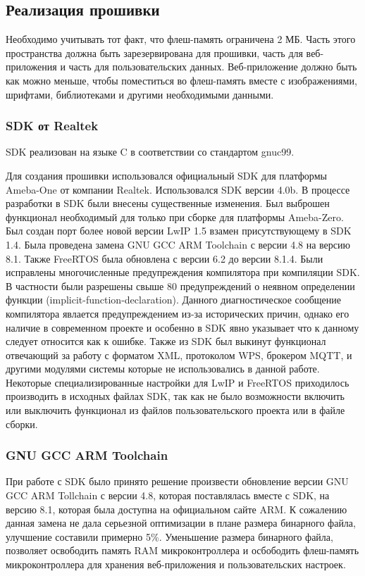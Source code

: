\subsection{Реализация прошивки}
Необходимо учитывать тот факт, что флеш-память ограничена 2 МБ. Часть этого пространства должна быть зарезервирована для прошивки, часть для веб-приложения и часть для пользовательских данных. Веб-приложение должно быть как можно меньше, чтобы поместиться во флеш-память вместе с изображениями, шрифтами, библиотеками и другими необходимыми данными. 

\subsubsection{SDK от Realtek}
SDK реализован на языке C в соответствии со стандартом gnuc99.

Для создания прошивки использовался официальный SDK для платформы Ameba-One от компании Realtek.
Использовался SDK версии 4.0b.
В процессе разработки в SDK были внесены существенные изменения. Был выброшен функционал необходимый для только при сборке для платформы Ameba-Zero. Был создан порт более новой версии LwIP 1.5 взамен присутствующему в SDK 1.4. Была проведена замена GNU GCC ARM Toolchain с версии 4.8 на версию 8.1. Также FreeRTOS была обновлена с версии 6.2 до версии 8.1.4. Были исправлены многочисленные предупреждения компилятора при компиляции SDK. В частности были разрешены свыше 80 предупреждений о неявном определении функции (implicit-function-declaration). Данного диагностическое сообщение компилятора явлается предупреждением из-за исторических причин, однако его наличие в современном проекте и особенно в SDK явно указывает что к данному следует относится как к ошибке. Также из SDK был выкинут функционал отвечающий за работу с форматом XML, протоколом WPS, брокером MQTT, и другими модулями системы которые не использовались в данной работе. Некоторые специализированные настройки для LwIP и FreeRTOS приходилось производить в исходных файлах SDK, так как не было возможности включить или выключить функционал из файлов пользовательского проекта или в файле сборки.


\subsubsection{GNU GCC ARM Toolchain}
При работе с SDK было принято решение произвести обновление версии GNU GCC ARM Tollchain с версии 4.8, которая поставлялась вместе с SDK, на версию 8.1, которая была доступна на официальном сайте ARM.
К сожалению данная замена не дала серьезной оптимизации в плане размера бинарного файла, улучшение составили примерно 5\%. Уменьшение размера бинарного файла, позволяет освободить память RAM микроконтроллера и осбободить флеш-память микроконтроллера для хранения веб-приложения и пользовательских настроек.

